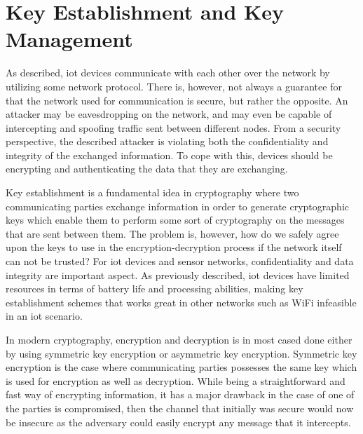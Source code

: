 

\section{Key Establishment and Key Management}
\label{sec:keyestablishment}

As described, \gls{iot} devices communicate with each other over the network by utilizing some network protocol. There is, however, not always a guarantee for that the network used for communication is secure, but rather the opposite. An attacker may be eavesdropping on the network, and may even be capable of intercepting and spoofing traffic sent between different nodes. From a security perspective, the described attacker is violating both the confidentiality and integrity of the exchanged information. To cope with this, devices should be encrypting and authenticating the data that they are exchanging. 



Key establishment is a fundamental idea in cryptography where two communicating parties exchange information in order to generate cryptographic keys which enable them to perform some sort of cryptography on the messages that are sent between them. The problem is, however, how do we safely agree upon the keys to use in the encryption-decryption process if the network itself can not be trusted? For \gls{iot} devices and sensor networks, confidentiality and data integrity are important aspect. As previously described, \gls{iot} devices have limited resources in terms of battery life and processing abilities, making key establishment schemes that works great in other networks such as WiFi infeasible in an \gls{iot} scenario.




In modern cryptography, encryption and decryption is in most cased done either by using symmetric key encryption or asymmetric key encryption. Symmetric key encryption is the case where communicating parties possesses the same key which is used for encryption as well as decryption. While being a straightforward and fast way of encrypting information, it has a major drawback in the case of one of the parties is compromised, then the channel that initially was secure would now be insecure as the adversary could easily encrypt any message that it intercepts.

